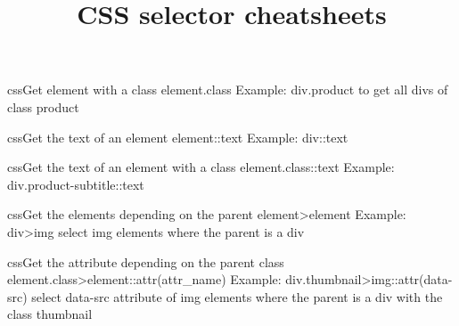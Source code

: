 \documentclass[10pt,a4paper]{article}
\title{\color{w3schools}CSS selector cheatsheets
}
\begin{document}
\maketitle

\small
\begin{multicols}{3}

\thispagestyle{empty}
\scriptsize



\begin{codebox}{css}{Get element with a class}
element.class
Example: div.product to get all divs of class product

\end{codebox}

\begin{codebox}{css}{Get the text of an element}
element::text
Example: div::text

\end{codebox}

\begin{codebox}{css}{Get the text of an element with a class}
element.class::text
Example: div.product-subtitle::text

\end{codebox}

\begin{codebox}{css}{Get the elements depending on the parent}
element>element
Example: div>img select img elements where the parent is a div

\end{codebox}

\begin{codebox}{css}{Get the attribute depending on the parent class}
element.class>element::attr(attr_name)
Example: div.thumbnail>img::attr(data-src) select data-src attribute of img 
elements where the parent is a div with the class thumbnail

\end{codebox}


\AtNextBibliography{\footnotesize}
\printbibliography  
\end{multicols}
\end{document}
